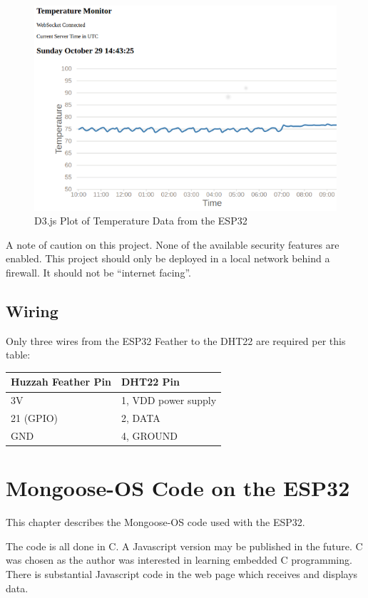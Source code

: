 \documentclass[oneside,letterpaper,12pt]{book}
\begin{document}
\begin{figure}
\centering
\includegraphics{tempviz1.png}
\caption{D3.js Plot of Temperature Data from the ESP32}
\end{figure}

A note of caution on this project. None of the available security
features are enabled. This project should only be deployed in a local
network behind a firewall. It should not be ``internet facing''.

\section{Wiring}\label{wiring}

Only three wires from the ESP32 Feather to the DHT22 are required per
this table:

\begin{longtable}[]{@{}ll@{}}
\toprule
Huzzah Feather Pin & DHT22 Pin\tabularnewline
\midrule
\endhead
3V & 1, VDD power supply\tabularnewline
21 (GPIO) & 2, DATA\tabularnewline
GND & 4, GROUND\tabularnewline
\bottomrule
\end{longtable}

\chapter{Mongoose-OS Code on the
ESP32}\label{mongoose-os-code-on-the-esp32}

This chapter describes the Mongoose-OS code used with the ESP32.

The code is all done in C. A Javascript version may be published in the
future. C was chosen as the author was interested in learning embedded C
programming. There is substantial Javascript code in the web page which
receives and displays data.
\end{document}

